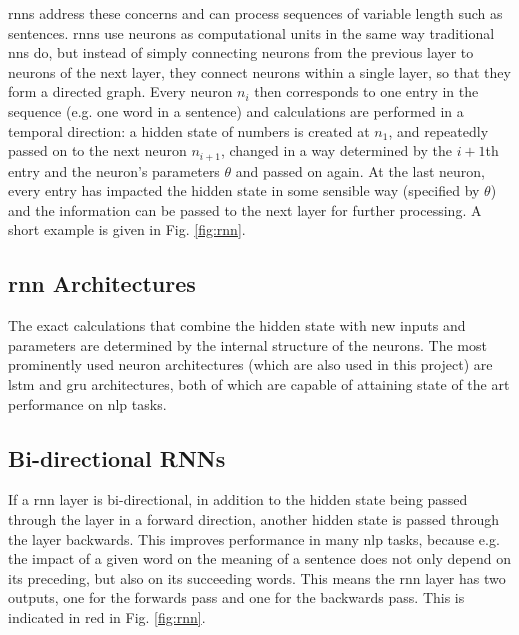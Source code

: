      \Glspl{rnn} address these concerns and can process sequences of variable length such as sentences. \Glspl{rnn} use \glspl{neuron} as computational units in the same way traditional \glspl{nn} do, but instead of simply connecting \glspl{neuron} from the previous layer to \glspl{neuron} of the next layer, they connect \glspl{neuron} within a single layer, so that they form a directed graph. Every \gls{neuron} $n_i$ then corresponds to one entry in the sequence (e.g. one word in a sentence) and calculations are performed in a temporal direction: a hidden state of numbers is created at $n_1$, and repeatedly passed on to the next \gls{neuron} $n_{i+1}$, changed in a way determined by the $i+1$th entry and the \gls{neuron}'s parameters $\theta$ and passed on again. At the last \gls{neuron}, every entry has impacted the hidden state in some sensible way (specified by $\theta$) and the information can be passed to the next layer for further processing. A short example is given in Fig. \ref{fig:rnn}.


    \subsection{\gls{rnn} Architectures \label{ssec: rnn architectures}}
    The exact calculations that combine the hidden state with new inputs and parameters are determined by the internal structure of the \glspl{neuron}. The most prominently used \gls{neuron} architectures (which are also used in this project) are \gls{lstm}\cite{hochreiter1997long} and \gls{gru}\cite{chung2014empirical} architectures, both of which are capable of attaining state of the art performance on \gls{nlp} tasks\cite{huang2015bidirectional}.

    \subsection{Bi-directional RNNs \label{ssec: bidirectional RNN}}
    If a \gls{rnn} layer is bi-directional, in addition to the hidden state being passed through the layer in a forward direction, another hidden state is passed through the layer backwards. This improves performance in many \gls{nlp} tasks, because e.g.  the impact of a given word on the meaning of a sentence does not only depend on its preceding, but also on its succeeding words. This means the \gls{rnn} layer has two outputs, one for the forwards pass and one for the backwards pass. This is indicated in red in Fig. \ref{fig:rnn}.

